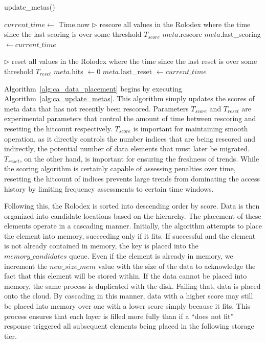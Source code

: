 \begin{algorithm}[htp]
	\small
	\caption{\label{alg:ca_update_metas}update\_metas()}
	\begin{algorithmic}[1]
	\STATE $current\_time \leftarrow$ Time.now
	\STATE $\triangleright$ rescore all values in the Rolodex where the time
	since the last scoring is over some threshold $T_{score}$
			\STATE $meta$.rescore
			\STATE $meta$.last\_scoring $\leftarrow current\_time$
		\ENDIF
	\ENDFOR
	
	\STATE $\triangleright$ reset all values in the Rolodex where the time
	since the last reset is over some threshold $T_{reset}$
			\STATE $meta$.hits $\leftarrow 0$
			\STATE $meta$.last\_reset $\leftarrow current\_time$
		\ENDIF
	\ENDFOR
\end{algorithmic}
\end{algorithm}

Algorithm~\ref{alg:ca_data_placement} begins by executing
Algorithm~\ref{alg:ca_update_metas}. This algorithm simply updates the scores
of meta data that has not recently been rescored. Parameters $T_{score}$ and
$T_{reset}$ are experimental parameters that control the amount of time between
rescoring and resetting the hitcount respectively. $T_{score}$ is important for
maintaining smooth operation, as it directly controls the number indices
that are being rescored and indirectly, the potential number of data elements
that must later be migrated. $T_{reset}$, on the other hand, is important for
ensuring the freshness of trends. While the scoring algorithm is certainly
capable of assessing penalties over time, resetting the hitcount of indices
prevents large trends from dominating the access history by limiting frequency
assessments to certain time windows.

Following this, the Rolodex is sorted into descending order by score. Data is
then organized into candidate locations based on the hierarchy. The placement
of these elements operate in a cascading manner. Initially, the algorithm
attempts to place the element into memory, succeeding only if it fits. If
successful and the element is not already contained in memory, the key is
placed into the $memory\_candidates$ queue. Even if the element is already in
memory, we increment the $new\_size\_mem$ value with the size of the data to
acknowledge the fact that this element will be stored within. If the data
cannot be placed into memory, the same process is duplicated with the disk.
Failing that, data is placed onto the cloud. By cascading in this manner, data
with a higher score may still be placed into memory over one with a lower score
simply because it fits. This process ensures that each layer is filled more
fully than if a ``does not fit'' response triggered all subsequent elements
being placed in the following storage tier.

